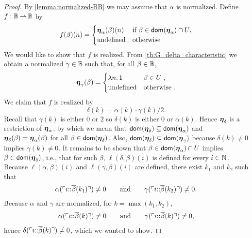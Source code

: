 \begin{proof}
  By \cref{lemma:normalized-BB} we may assume that $\alpha$ is normalized.
  Define $f: \mathbb{B} \mathbin{\rightharpoonup} \mathbb{B}$ by
  \begin{equation*}
    f(\beta)(n) =
    \begin{cases}
      \text{\boldmath{$\eta$}}_{\alpha}(\beta)(n) &
      \text{if $\beta \in \mathsf{dom}(\text{\boldmath{$\eta$}}_\alpha) \cap U$,} \\
      \text{undefined} & \text{otherwise}
    \end{cases}
  \end{equation*}
  We would like to show that $f$ is realized. From \cref{th:G_delta_characteristic} we obtain a normalized $\gamma \in \mathbb{B}$ such that, for all $\beta \in \mathbb{B}$,
  \begin{equation*}
    \text{\boldmath{$\eta$}}_{\gamma}(\beta) =
    \begin{cases}
      \lambda n .\,1 & \beta \in U \;,\\
      \text{undefined} & \text{otherwise} \;.
    \end{cases}
  \end{equation*}
  We claim that $f$ is realized by
  \begin{equation*}
    \delta(k) = \alpha(k) \cdot \gamma(k)/2.
  \end{equation*}
  Recall that $\gamma(k)$ is either $0$ or $2$ so $\delta(k)$ is
  either $0$ or $\alpha(k)$. Hence $\text{\boldmath{$\eta$}}_\delta$ is a restriction of
  $\text{\boldmath{$\eta$}}_\alpha$, by which we mean that $\mathsf{dom}(\text{\boldmath{$\eta$}}_\delta) \subseteq
  \mathsf{dom}(\text{\boldmath{$\eta$}}_\alpha)$ and $\text{\boldmath{$\eta$}}_{\delta}(\beta) = \text{\boldmath{$\eta$}}_{\alpha}(\beta)$
  for all $\beta \in \mathsf{dom}(\text{\boldmath{$\eta$}}_\delta)$. Also, $\mathsf{dom}(\text{\boldmath{$\eta$}}_\delta)
  \subseteq \mathsf{dom}(\text{\boldmath{$\eta$}}_\gamma)$ because $\delta(k) \neq 0$ implies
  $\gamma(k) \neq 0$. It remains to be shown that $\beta \in
  \mathsf{dom}(\text{\boldmath{$\eta$}}_\alpha) \cap U$ implies $\beta \in \mathsf{dom}(\text{\boldmath{$\eta$}}_\delta)$,
  i.e., that for such $\beta$, $\ell(\delta, \beta)(i)$ is
  defined for every $i \in \mathbb{N}$. Because $\ell(\alpha, \beta)(i)$
  and $\ell(\gamma, \beta)(i)$ are
  defined, there exist $k_1$ and $k_2$ such that
  \begin{equation*}
    \alpha(\ulcorner i {:}{:} \overline{\beta}(k_1) \urcorner) \neq 0
    \qquad\text{and}\qquad
    \gamma(\ulcorner i {:}{:} \overline{\beta}(k_2) \urcorner) \neq 0.
  \end{equation*}
  Because $\alpha$ and $\gamma$ are normalized, for $k = \max(k_1,
  k_2)$,
  \begin{equation*}
    \alpha(\ulcorner i {:}{:} \overline{\beta}(k) \urcorner) \neq 0
    \qquad\text{and}\qquad
    \gamma(\ulcorner i {:}{:} \overline{\beta}(k) \urcorner) \neq 0,
  \end{equation*}
  hence $\delta(\ulcorner i {:}{:} \overline{\beta}(k) \urcorner) \neq 0$, which we
  wanted to show.
\end{proof}

